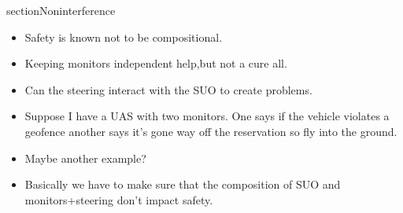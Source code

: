 section{Noninterference} \label{sec:noninter}        

\noindent{}

\begin{itemize}
\item Safety is known not to be compositional. 
\item Keeping monitors independent help,but not a cure all. 
\item Can the steering interact with the SUO to create problems. 
\item Suppose I have a UAS with two monitors. One says if the vehicle  violates a
geofence another says it's gone way off the reservation so fly into
the ground. 
\item Maybe another example?
\item Basically we have to make sure that the composition of SUO and
monitors+steering don't impact safety.  
\end{itemize} 